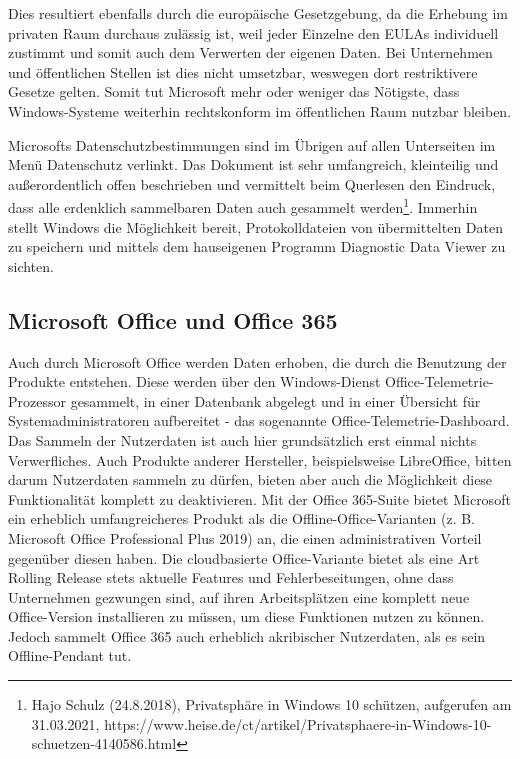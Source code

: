Dies resultiert ebenfalls durch die europäische Gesetzgebung, da die Erhebung im privaten Raum durchaus zulässig ist, weil jeder Einzelne den EULAs individuell zustimmt und somit auch dem Verwerten der eigenen Daten. Bei Unternehmen und öffentlichen Stellen ist dies nicht umsetzbar, weswegen dort restriktivere Gesetze gelten. Somit tut Microsoft mehr oder weniger das Nötigste, dass Windows-Systeme weiterhin rechtskonform im öffentlichen Raum nutzbar bleiben.

Microsofts Datenschutzbestimmungen sind im Übrigen auf allen Unterseiten im Menü \glqq Datenschutz\grqq{} verlinkt. Das Dokument ist sehr umfangreich, kleinteilig und außerordentlich offen beschrieben und vermittelt beim Querlesen den Eindruck, dass alle erdenklich sammelbaren Daten auch gesammelt werden\footnote{Hajo Schulz (24.8.2018), Privatsphäre in Windows 10 schützen, aufgerufen am 31.03.2021, https://www.heise.de/ct/artikel/Privatsphaere-in-Windows-10-schuetzen-4140586.html}. Immerhin stellt Windows die Möglichkeit bereit, Protokolldateien von übermittelten Daten zu speichern und mittels dem hauseigenen Programm \glqq Diagnostic Data Viewer\grqq{} zu sichten.

\subsection{Microsoft Office und Office 365}
Auch durch Microsoft Office werden Daten erhoben, die durch die Benutzung der Produkte entstehen. Diese werden über den Windows-Dienst \glqq Office-Telemetrie-Prozessor\grqq{} gesammelt, in einer Datenbank abgelegt und in einer Übersicht für Systemadministratoren aufbereitet - das sogenannte \glqq Office-Telemetrie-Dashboard\grqq{}.\\
Das Sammeln der Nutzerdaten ist auch hier grundsätzlich erst einmal nichts Verwerfliches. Auch Produkte anderer Hersteller, beispielsweise LibreOffice, bitten darum Nutzerdaten sammeln zu dürfen, bieten aber auch die Möglichkeit diese Funktionalität komplett zu deaktivieren. Mit der \glqq Office 365\grqq{}-Suite bietet Microsoft ein erheblich umfangreicheres Produkt als die Offline-Office-Varianten (z. B. Microsoft Office Professional Plus 2019) an, die einen administrativen Vorteil gegenüber diesen haben. Die cloudbasierte Office-Variante bietet als eine Art \glqq Rolling Release\grqq{} stets aktuelle Features und Fehlerbeseitungen, ohne dass Unternehmen gezwungen sind, auf ihren Arbeitsplätzen eine komplett neue Office-Version installieren zu müssen, um diese Funktionen nutzen zu können. Jedoch sammelt Office 365 auch erheblich akribischer Nutzerdaten, als es sein Offline-Pendant tut.

